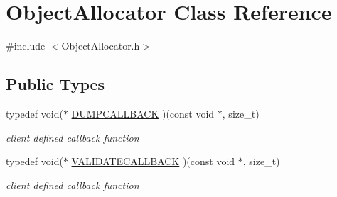 \hypertarget{classObjectAllocator}{\section{Object\-Allocator Class Reference}
\label{classObjectAllocator}
}


{\ttfamily \#include $<$Object\-Allocator.\-h$>$}

\subsection*{Public Types}
\begin{DoxyCompactItemize}
\item 
\hypertarget{classObjectAllocator_a24de32ff63104b1c2c69bc03356eb736}{typedef void($\ast$ \hyperlink{classObjectAllocator_a24de32ff63104b1c2c69bc03356eb736}{D\-U\-M\-P\-C\-A\-L\-L\-B\-A\-C\-K} )(const void $\ast$, size\-\_\-t)}\label{classObjectAllocator_a24de32ff63104b1c2c69bc03356eb736}

\begin{DoxyCompactList}\small\item\em client defined callback function \end{DoxyCompactList}\item 
\hypertarget{classObjectAllocator_aca4db22d00e33e35292aca076d3942ac}{typedef void($\ast$ \hyperlink{classObjectAllocator_aca4db22d00e33e35292aca076d3942ac}{V\-A\-L\-I\-D\-A\-T\-E\-C\-A\-L\-L\-B\-A\-C\-K} )(const void $\ast$, size\-\_\-t)}\label{classObjectAllocator_aca4db22d00e33e35292aca076d3942ac}

\begin{DoxyCompactList}\small\item\em client defined callback function \end{DoxyCompactList}\end{DoxyCompactItemize}
